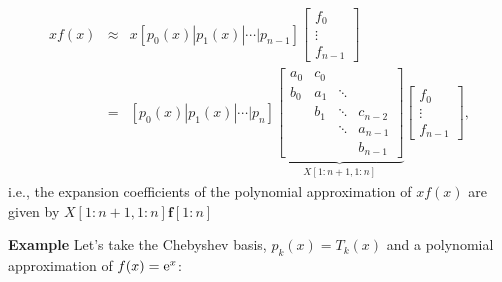 \documentclass[12pt,landscape]{article}
\begin{document}
{\begin{eqnarray*}
xf(x) & \approx & x[p_0(x) | p_1(x) | \ensuremath{\cdots} | p_{n-1}]\begin{bmatrix}
f_0 \\
\vdots \\
f_{n-1}
\end{bmatrix}  \\
&=& [p_0(x) | p_1(x) | \ensuremath{\cdots} | p_{n}]
\underbrace{\begin{bmatrix}
a_0  & c_0  &     &      \\
b_0  & a_1  & \ddots    &       \\
     & b_1  & \ddots & c_{n-2}   \\
     &      & \ddots & a_{n-1}    \\
     &      &        & b_{n-1} 
\end{bmatrix}}_{X[1:n+1,1:n]}
\begin{bmatrix}
f_0 \\
\vdots \\
f_{n-1}
\end{bmatrix} ,
\end{eqnarray*}
i.e., the expansion coefficients of the polynomial approximation of $xf(x)$ are given by $X[1\!\!:\!n+1,1\!\!:\!n]\mathbf{f}[1\!\!:\!n]$

\textbf{Example} Let's take the Chebyshev basis, $p_k(x) = T_k(x)$ and a polynomial approximation of $f(x) = {\rm e}^x$:


}
\end{document}
